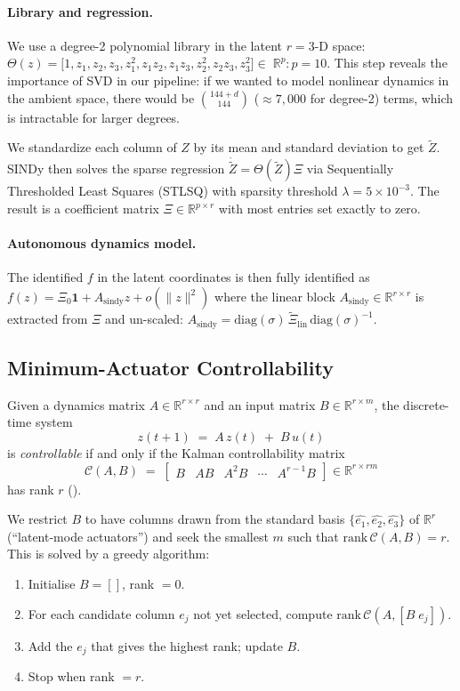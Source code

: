 \documentclass[11pt]{article}
\begin{document}
\paragraph{Library and regression.}
We use a degree-2 polynomial library in the latent $r=3$-D space: $\Theta(z) = \bigl[1, z_1, z_2, z_3, z_1^2, z_1 z_2, z_1 z_3, z_2^2, z_2 z_3, z_3^2\bigr] \in\;\mathbb{R}^{p} : p = 10$.
This step reveals the importance of SVD in our pipeline: if we wanted to model nonlinear dynamics in the ambient space, there would be $\binom{144+d}{144}$ ($\approx 7{,}000$ for degree-2) terms, which is intractable for larger degrees.

We standardize each column of $Z$ by its mean and standard deviation to get $\tilde{Z}$. SINDy then solves the sparse regression
$\dot{\tilde{Z}} = \Theta(\tilde{Z}) \Xi$ via Sequentially Thresholded Least Squares (STLSQ) with sparsity threshold $\lambda = 5\times 10^{-3}$.
The result is a coefficient matrix $\Xi \in \mathbb{R}^{p \times r}$ with most entries set exactly to zero.

\paragraph{Autonomous dynamics model.}
The identified $f$ in the latent coordinates is then fully identified as $f(z) = \Xi_0 \mathbf{1} + A_{\mathrm{sindy}}z + o(\lVert z \rVert^2)$
where the linear block $A_{\mathrm{sindy}} \in \mathbb{R}^{r\times r}$ is
extracted from $\Xi$ and un-scaled:
$A_{\mathrm{sindy}} = \mathrm{diag}(\sigma)\,\tilde{\Xi}_{\mathrm{lin}}\,
\mathrm{diag}(\sigma)^{-1}$.

\subsection{Minimum-Actuator Controllability}
\label{sec:ctrl}

Given a dynamics matrix $A \in \mathbb{R}^{r\times r}$ and an input matrix
$B \in \mathbb{R}^{r\times m}$, the discrete-time system
\[
  z(t+1) \;=\; A\,z(t) \;+\; B\,u(t)
\]
is \textit{controllable} if and only if the Kalman controllability matrix
\[
  \mathcal{C}(A,B) \;=\;
  \begin{bmatrix} B & AB & A^2B & \cdots & A^{r-1}B \end{bmatrix}
  \in \mathbb{R}^{r \times rm}
\]
has rank $r$ (\cite{kalman1960}).

We restrict $B$ to have columns drawn from the standard basis $\{\hat{e_1}, \hat{e_2}, \hat{e_3}\}$
of $\mathbb{R}^r$ (``latent-mode actuators'') and seek the smallest $m$ such that
$\mathrm{rank}\,\mathcal{C}(A,B) = r$. This is solved by a greedy algorithm:
\begin{enumerate}[noitemsep]
  \item Initialise $B = []$, rank $= 0$.
  \item For each candidate column $e_j$ not yet selected, compute
        $\mathrm{rank}\,\mathcal{C}(A, [B\; e_j])$.
  \item Add the $e_j$ that gives the highest rank; update $B$.
  \item Stop when rank $= r$.
\end{enumerate}
\end{document}
